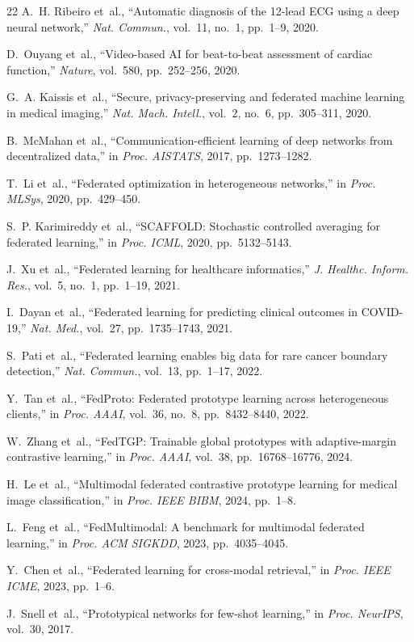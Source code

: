 \documentclass[conference]{IEEEtran}
\begin{document}
\begin{thebibliography}{22}
A.~H. Ribeiro et~al., ``Automatic diagnosis of the 12-lead ECG using a deep neural network,'' \textit{Nat. Commun.}, vol.~11, no.~1, pp.~1--9, 2020.

D.~Ouyang et~al., ``Video-based AI for beat-to-beat assessment of cardiac function,'' \textit{Nature}, vol.~580, pp.~252--256, 2020.

G.~A. Kaissis et~al., ``Secure, privacy-preserving and federated machine learning in medical imaging,'' \textit{Nat. Mach. Intell.}, vol.~2, no.~6, pp.~305--311, 2020.

B.~McMahan et~al., ``Communication-efficient learning of deep networks from decentralized data,'' in \textit{Proc. AISTATS}, 2017, pp.~1273--1282.

T.~Li et~al., ``Federated optimization in heterogeneous networks,'' in \textit{Proc. MLSys}, 2020, pp.~429--450.

S.~P. Karimireddy et~al., ``SCAFFOLD: Stochastic controlled averaging for federated learning,'' in \textit{Proc. ICML}, 2020, pp.~5132--5143.

J.~Xu et~al., ``Federated learning for healthcare informatics,'' \textit{J. Healthc. Inform. Res.}, vol.~5, no.~1, pp.~1--19, 2021.

I.~Dayan et~al., ``Federated learning for predicting clinical outcomes in COVID-19,'' \textit{Nat. Med.}, vol.~27, pp.~1735--1743, 2021.

S.~Pati et~al., ``Federated learning enables big data for rare cancer boundary detection,'' \textit{Nat. Commun.}, vol.~13, pp.~1--17, 2022.

Y.~Tan et~al., ``FedProto: Federated prototype learning across heterogeneous clients,'' in \textit{Proc. AAAI}, vol.~36, no.~8, pp.~8432--8440, 2022.

W.~Zhang et~al., ``FedTGP: Trainable global prototypes with adaptive-margin contrastive learning,'' in \textit{Proc. AAAI}, vol.~38, pp.~16768--16776, 2024.

H.~Le et~al., ``Multimodal federated contrastive prototype learning for medical image classification,'' in \textit{Proc. IEEE BIBM}, 2024, pp.~1--8.

L.~Feng et~al., ``FedMultimodal: A benchmark for multimodal federated learning,'' in \textit{Proc. ACM SIGKDD}, 2023, pp.~4035--4045.

Y.~Chen et~al., ``Federated learning for cross-modal retrieval,'' in \textit{Proc. IEEE ICME}, 2023, pp.~1--6.

J.~Snell et~al., ``Prototypical networks for few-shot learning,'' in \textit{Proc. NeurIPS}, vol.~30, 2017.

\end{thebibliography}
\end{document}
